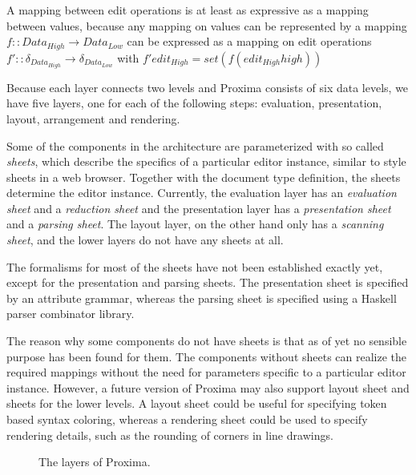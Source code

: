 A mapping between edit operations is at least as expressive as a mapping between values, because any 
mapping on values can be represented by a mapping 
$f :: Data_{High} \rightarrow Data_{Low}$ can be expressed as a mapping on edit operations
$f' ::  \delta_{Data_{High}} \rightarrow \delta_{Data_{Low}}$ with $f' edit_{High} = set (f (edit_{High}high))$
\ec


Because each layer connects two levels and Proxima  consists of six data levels, we have five layers, one for each of the following steps: evaluation, presentation, layout, arrangement and rendering.

Some of the components in the architecture are parameterized with so called {\em sheets}, which describe the specifics of a particular editor instance, similar to style sheets in a web browser. Together with the document type definition, the sheets determine the editor instance. Currently, the evaluation layer has an {\em evaluation sheet} and a {\em reduction sheet} and the presentation layer has a {\em presentation sheet} and a {\em parsing sheet}.  The layout layer, on the other hand only has a {\em scanning sheet}, and the lower layers do not have any sheets at all. 

The formalisms for most of the sheets have not been established exactly yet, except for the presentation and parsing sheets. The presentation sheet is specified by an attribute grammar, whereas the parsing sheet is specified using a Haskell parser combinator library.

The reason why some components do not have sheets is that as of yet no sensible purpose has been found for them. The components without sheets can realize the required mappings without the need for parameters specific to a particular editor instance. However, a future version of Proxima may also support layout sheet and sheets for the lower levels. A layout sheet could be useful for specifying token based syntax coloring, whereas a rendering sheet could be used to specify rendering details, such as the rounding of corners in line drawings.

\begin{figure}
\begin{small}
\begin{center}
\begin{center}
\end{center}\caption{The layers of Proxima.}\label{proxLayers} 
\end{center}
\end{small}
\end{figure}


